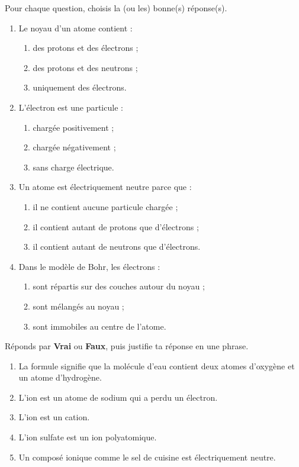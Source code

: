 \documentclass[11pt]{article}
\begin{document}
\begin{exercice}
Pour chaque question, choisis la (ou les) bonne(s) réponse(s).
\begin{enumerate}
\item Le noyau d'un atome contient :
\begin{enumerate}
\item des protons et des électrons ;
\item des protons et des neutrons ;
\item uniquement des électrons.
\end{enumerate}
\item L'électron est une particule :
\begin{enumerate}
\item chargée positivement ;
\item chargée négativement ;
\item sans charge électrique.
\end{enumerate}
\item Un atome est électriquement neutre parce que :
\begin{enumerate}
\item il ne contient aucune particule chargée ;
\item il contient autant de protons que d'électrons ;
\item il contient autant de neutrons que d'électrons.
\end{enumerate}
\item Dans le modèle de Bohr, les électrons :
\begin{enumerate}
\item sont répartis sur des couches autour du noyau ;
\item sont mélangés au noyau ;
\item sont immobiles au centre de l'atome.
\end{enumerate}
\end{enumerate}
\end{exercice}

\begin{exercice}
Réponds par \textbf{Vrai} ou \textbf{Faux}, puis justifie ta réponse en une phrase.
\begin{enumerate}
\item La formule  signifie que la molécule d'eau contient deux atomes d'oxygène et un atome d'hydrogène.
\item L'ion  est un atome de sodium qui a perdu un électron.
\item L'ion  est un cation.
\item L'ion sulfate  est un ion polyatomique.
\item Un composé ionique comme le sel de cuisine  est électriquement neutre.
\end{enumerate}
\end{exercice}
\end{document}
